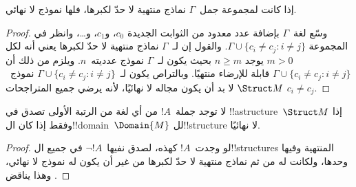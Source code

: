 \documentclass[../../../include/open-logic-section]{subfiles}
\begin{document}

\begin{thm}
 إذا كانت لمجموعة جمل~$\Gamma$ نماذج منتهية لا حدّ
لكبرها، فلها نموذج لا نهائي.
\end{thm}

\begin{proof}
وسّع لغة~$\Gamma$ بإضافة عدد معدود من الثوابت الجديدة $c_0$، و$c_1$،
و\dots، وانظر في المجموعة $\Gamma \cup \{c_i \neq c_j : i \neq
  j\}$. والقول إن لـ~$\Gamma$ نماذج منتهية لا حدّ لكبرها يعني أنه
لكل $m >0$ يوجد $n\ge m$ بحيث يكون لـ~$\Gamma$ نموذج عدديته~$n$.
ويلزم من ذلك أن $\Gamma \cup \{c_i \neq c_j : i \neq j\}$ قابلة
للإرضاء منتهيًا. وبالتراص يكون لـ~$\Gamma \cup \{c_i \neq c_j : i
\neq j\}$ نموذج~$\Struct M$ لا بد أن يكون مجاله لا نهائيًا، لأنه
يرضي جميع المتراجحات $c_i \neq c_j$.
\end{proof}

\begin{prop}
لا توجد جملة~$!A$ من أي لغة من الرتبة الأولى تصدق في
!!a{structure}~$\Struct M$ إذا وفقط إذا كان ال!!{domain}~$\Domain{M}$
لل!!{structure} لا نهائيًا.
\end{prop}

\begin{proof}
لو وجدت~$!A$ كهذه، لصدق نفيها~$\lnot !A$ في جميع ال!!{structure}s
  المنتهية وفيها وحدها، ولكانت له من ثم نماذج منتهية لا حدّ لكبرها من
غير أن يكون له نموذج لا نهائي، وهذا يناقض .
\end{proof}
\end{document}
